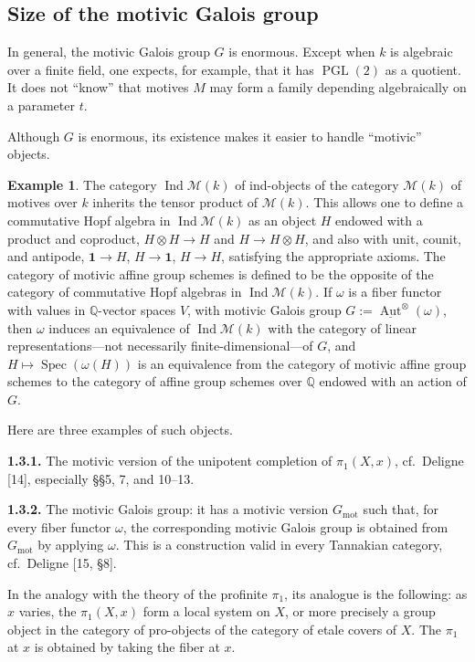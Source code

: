 \documentclass[11pt,a4paper]{article}
\theoremstyle{plain}
\theoremstyle{definition}
\newtheorem{example}[theorem]{Example}
\DeclareMathOperator{\Spec}{Spec}
\DeclareMathOperator{\Aut}{Aut}
\DeclareMathOperator{\PGL}{PGL}
\DeclareMathOperator{\Ind}{Ind}
\newcommand{\Q}{\mathbb{Q}}
\DeclareMathOperator{\mot}{mot}
\begin{document}
\subsection{Size of the motivic Galois group}

In general, the motivic Galois group $G$ is enormous. Except when $k$ is algebraic over a finite field, one expects, for example, that it has $\PGL(2)$ as a quotient. It does not ``know'' that motives $M$ may form a family depending algebraically on a parameter $t$.

Although $G$ is enormous, its existence makes it easier to handle ``motivic'' objects.

\begin{example}
The category $\Ind\mathcal{M}(k)$ of ind-objects of the category $\mathcal{M}(k)$ of motives over $k$ inherits the tensor product of $\mathcal{M}(k)$. This allows one to define a commutative Hopf algebra in $\Ind\mathcal{M}(k)$ as an object $H$ endowed with a product and coproduct, $H\otimes H\to H$ and $H\to H\otimes H$, and also with unit, counit, and antipode, $\mathbf{1}\to H$, $H\to\mathbf{1}$, $H\to H$, satisfying the appropriate axioms. The category of motivic affine group schemes is defined to be the opposite of the category of commutative Hopf algebras in $\Ind\mathcal{M}(k)$. If $\omega$ is a fiber functor with values in $\Q$-vector spaces $V$, with motivic Galois group $G:=\underline{\Aut}^{\otimes}(\omega)$, then $\omega$ induces an equivalence of $\Ind\mathcal{M}(k)$ with the category of linear representations---not necessarily finite-dimensional---of $G$, and $H\mapsto \Spec(\omega(H))$ is an equivalence from the category of motivic affine group schemes to the category of affine group schemes over $\Q$ endowed with an action of $G$.

Here are three examples of such objects.

\textbf{1.3.1.} The motivic version of the unipotent completion of $\pi_1(X,x)$, cf.~Deligne [14], especially \S\S5, 7, and 10--13.

\textbf{1.3.2.} The motivic Galois group: it has a motivic version $G_{\mot}$ such that, for every fiber functor $\omega$, the corresponding motivic Galois group is obtained from $G_{\mot}$ by applying $\omega$. This is a construction valid in every Tannakian category, cf.~Deligne [15, \S8].

In the analogy with the theory of the profinite $\pi_1$, its analogue is the following: as $x$ varies, the $\pi_1(X,x)$ form a local system on $X$, or more precisely a group object in the category of pro-objects of the category of etale covers of $X$. The $\pi_1$ at $x$ is obtained by taking the fiber at $x$.


\end{example}
\end{document}
